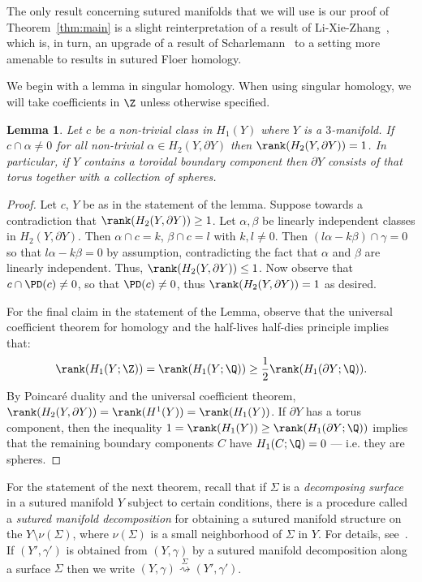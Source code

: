 \documentclass{amsart}
\newtheorem{lemma}[theorem]{Lemma}
\theoremstyle{definition}
\theoremstyle{remark}
\numberwithin{equation}{section}
\begin{document}
The only result concerning sutured manifolds that we will use is our proof of Theorem~\ref{thm:main} is a slight reinterpretation of a result of Li-Xie-Zhang~\cite[Theorem 2.9]{li2022floer}, which is, in turn, an upgrade of a result of Scharlemann~\cite[Theorem 4.19]{scharlemann1989sutured} to a setting more amenable to results in sutured Floer homology.

We begin with a lemma in singular homology. When using singular homology, we will take coefficients in $\Z$ unless otherwise specified.

\begin{lemma}\label{lem:sinhom}
    Let $c$ be a non-trivial class in $H_{1}(Y)$ where $Y$ is a $3$-manifold. If $c\cap\alpha\neq 0$ for all non-trivial $\alpha\in H_2(Y,\partial Y)$ then $\rank(H_2(Y,\partial Y))=1$. In particular, if $Y$ contains a toroidal boundary component then $\partial Y$ consists of that torus together with a collection of spheres.

    
\end{lemma}

\begin{proof}
  Let $c$, $Y$ be as in the statement of the lemma. Suppose towards a contradiction that ${\rank(H_2(Y,\partial Y))\geq 1}$. Let $\alpha,\beta$ be linearly independent classes in $H_2(Y,\partial Y)$. Then $\alpha\cap c=k$, $\beta\cap c=l$ with $k,l\neq 0$. Then $(l\alpha-k\beta)\cap \gamma=0$ so that $l\alpha-k\beta=0$ by assumption, contradicting the fact that $\alpha$ and $\beta$ are linearly independent. Thus, $\rank(H_2(Y,\partial Y))\leq 1$. Now observe that $c\cap\PD(c)\neq 0$, so that $\PD(c)\neq 0$, thus $\rank(H_2(Y,\partial Y))=1$ as desired.

For the final claim in the statement of the Lemma, observe that the universal coefficient theorem for homology and the half-lives half-dies principle implies that: $$\rank(H_1(Y;\Z))=\rank(H_1(Y;\Q))\geq \dfrac{1}{2}\rank(H_1(\partial Y;\Q)).$$ By Poincar\'e duality and the universal coefficient theorem, $\rank(H_2(Y,\partial Y))=\rank(H^1(Y))=\rank (H_1(Y))$. If $\partial Y$ has a torus component, then the inequality $1=\rank(H_1(Y))\geq \rank(H_1(\partial Y;\Q))$ implies that the remaining boundary components $C$ have $H_1(C;\Q)=0$ --- i.e. they are spheres.
\end{proof}


For the statement of the next theorem, recall that if $\Sigma$ is a \emph{decomposing surface} in a sutured manifold $Y$ subject to certain conditions, there is a procedure called a \emph{sutured manifold decomposition} for obtaining a sutured manifold structure on the $Y\setminus\nu(\Sigma)$, where $\nu(\Sigma)$ is a small neighborhood of $\Sigma$ in $Y$. For details, see~\cite[Definition 3.1]{gabai1983foliations}. If $(Y',\gamma')$ is obtained from $(Y,\gamma)$ by a sutured manifold decomposition along a surface $\Sigma$ then we write $(Y,\gamma)\overset{\Sigma}{\rightsquigarrow}(Y',\gamma')$.
\end{document}
